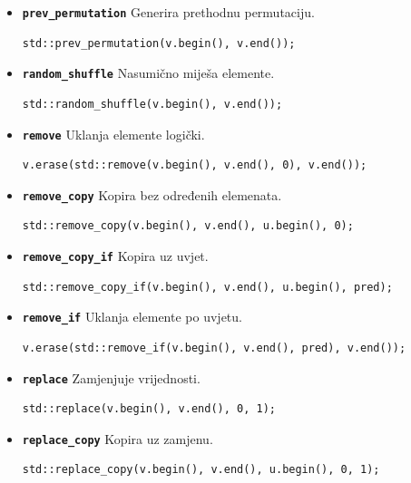 \begin{itemize}
\item \textbf{\texttt{prev\_permutation}}\newline
Generira prethodnu permutaciju.
\begin{verbatim}
std::prev_permutation(v.begin(), v.end());
\end{verbatim}

\item \textbf{\texttt{random\_shuffle}}\newline
Nasumično miješa elemente.
\begin{verbatim}
std::random_shuffle(v.begin(), v.end());
\end{verbatim}

\item \textbf{\texttt{remove}}\newline
Uklanja elemente logički.
\begin{verbatim}
v.erase(std::remove(v.begin(), v.end(), 0), v.end());
\end{verbatim}

\item \textbf{\texttt{remove\_copy}}\newline
Kopira bez određenih elemenata.
\begin{verbatim}
std::remove_copy(v.begin(), v.end(), u.begin(), 0);
\end{verbatim}

\item \textbf{\texttt{remove\_copy\_if}}\newline
Kopira uz uvjet.
\begin{verbatim}
std::remove_copy_if(v.begin(), v.end(), u.begin(), pred);
\end{verbatim}

\item \textbf{\texttt{remove\_if}}\newline
Uklanja elemente po uvjetu.
\begin{verbatim}
v.erase(std::remove_if(v.begin(), v.end(), pred), v.end());
\end{verbatim}

\item \textbf{\texttt{replace}}\newline
Zamjenjuje vrijednosti.
\begin{verbatim}
std::replace(v.begin(), v.end(), 0, 1);
\end{verbatim}

\item \textbf{\texttt{replace\_copy}}\newline
Kopira uz zamjenu.
\begin{verbatim}
std::replace_copy(v.begin(), v.end(), u.begin(), 0, 1);
\end{verbatim}


\end{itemize}
